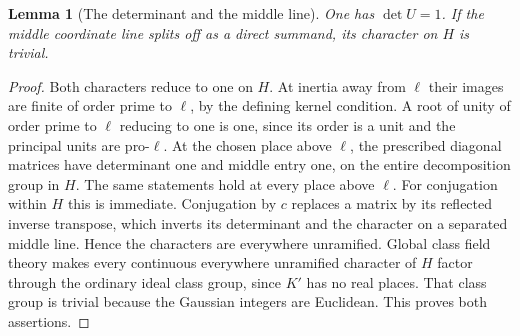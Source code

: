 \documentclass[a4paper,11pt]{article}
\newtheorem{lemma}[proposition]{Lemma}
\theoremstyle{definition}
\theoremstyle{remark}
\numberwithin{equation}{section}
\begin{document}
\begin{lemma}[The determinant and the middle line]\label{lem:det40}
One has \(\det U=1\). If the middle coordinate line splits off as a direct summand, its character on \(H\) is trivial.
\end{lemma}
\begin{proof}
Both characters reduce to one on \(H\). At inertia away from \(\ell\) their images are finite of order prime to \(\ell\), by the defining kernel condition. A root of unity of order prime to \(\ell\) reducing to one is one, since its order is a unit and the principal units are pro-\(\ell\). At the chosen place above \(\ell\), the prescribed diagonal matrices have determinant one and middle entry one, on the entire decomposition group in \(H\). The same statements hold at every place above \(\ell\). For conjugation within \(H\) this is immediate. Conjugation by \(c\) replaces a matrix by its reflected inverse transpose, which inverts its determinant and the character on a separated middle line. Hence the characters are everywhere unramified. Global class field theory makes every continuous everywhere unramified character of \(H\) factor through the ordinary ideal class group, since \(K'\) has no real places. That class group is trivial because the Gaussian integers are Euclidean. This proves both assertions.
\end{proof}
\end{document}
